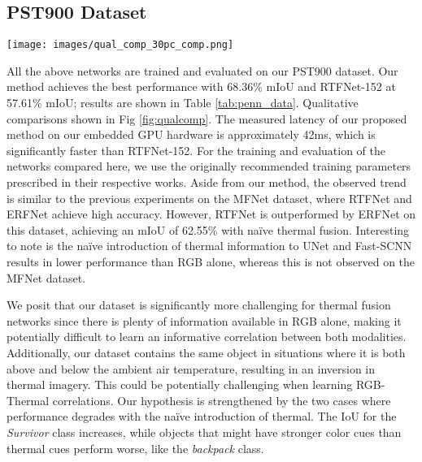 \documentclass[letterpaper, 10 pt, conference]{ieeeconf}
\begin{document}
\subsection{PST900 Dataset}

\begin{figure*}[t]
\begin{center}
\texttt{[image: images/qual\_comp\_30pc\_comp.png]}
\vspace{-0.25cm}
\end{center}
   \caption{\textit{Qualitative Results} on PST900: Our method is able to perform accurate segmentation of distant objects such as the \textit{Survivor} in \textit{(1)}. Our method also performs well in blurred and and visually degraded settings such as in \textit{(2)} where motion blur degrades the RGB image but the thermal image is able to help produce an accurate prediction. Example \textit{(3)} shows a clearly visible \textit{Fire Extinguisher} that is mistakenly identified by RTFNet-152, potentially because of weak thermal cues in the dataset and because of insufficient learning of color cues. Example \textit{(4)} shows our method perform poorly on the \textit{Survivor}; a portion of the survivor's leg appears to be near ground temperature and this leads to noisy segmentation in that region.}
\label{fig:qualcomp}
\vspace{-0.45cm}
\end{figure*}

All the above networks are trained and evaluated on our PST900 dataset. Our method achieves the best performance with 68.36\% mIoU and RTFNet-152 at 57.61\% mIoU; results are shown in Table \ref{tab:penn_data}. Qualitative comparisons shown in Fig \ref{fig:qualcomp}. The measured latency of our proposed method on our embedded GPU hardware is approximately 42ms, which is significantly faster than RTFNet-152. For the training and evaluation of the networks compared here, we use the originally recommended training parameters prescribed in their respective works. Aside from our method, the observed trend is similar to the previous experiments on the MFNet dataset, where RTFNet and ERFNet achieve high accuracy. However, RTFNet is outperformed by ERFNet on this dataset, achieving an mIoU of 62.55\% with na\"ive thermal fusion. Interesting to note is the na\"ive introduction of thermal information to UNet and Fast-SCNN results in lower performance than RGB alone, whereas this is not observed on the MFNet dataset. 

We posit that our dataset is significantly more challenging for thermal fusion networks since there is plenty of information available in RGB alone, making it potentially difficult to learn an informative correlation between both modalities. Additionally, our dataset contains the same object in situations where it is both above and below the ambient air temperature, resulting in an inversion in thermal imagery. This could be potentially challenging when learning RGB-Thermal correlations. Our hypothesis is strengthened by the two cases where performance degrades with the na\"ive introduction of thermal. The IoU for the \textit{Survivor} class increases, while objects that might have stronger color cues than thermal cues perform worse, like the \textit{backpack} class. 
\end{document}
